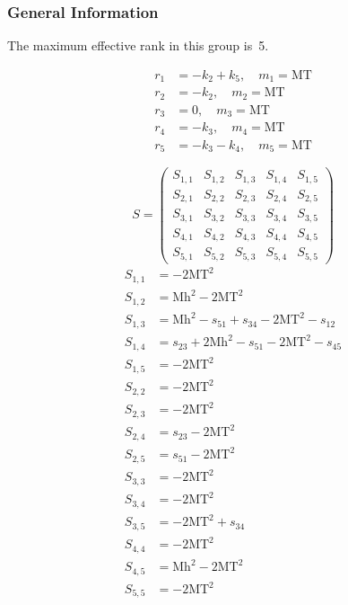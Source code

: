 \documentclass[a4paper]{article}
\begin{document}
\subsubsection*{General Information}
The maximum effective rank in this group is~5.

\begin{subequations}
\begin{align}
r_{1} &= -k_{2}+k_{5},\quad m_{1} = \text{MT}\\
r_{2} &= -k_{2},\quad m_{2} = \text{MT}\\
r_{3} &= 0,\quad m_{3} = \text{MT}\\
r_{4} &= -k_{3},\quad m_{4} = \text{MT}\\
r_{5} &= -k_{3}-k_{4},\quad m_{5} = \text{MT}
\end{align}
\end{subequations}

\begin{equation}
S=\left(\begin{array}{ccccc}
   S_{1,1}&
   S_{1,2}&
   S_{1,3}&
   S_{1,4}&
   S_{1,5}\\
   S_{2,1}&
   S_{2,2}&
   S_{2,3}&
   S_{2,4}&
   S_{2,5}\\
   S_{3,1}&
   S_{3,2}&
   S_{3,3}&
   S_{3,4}&
   S_{3,5}\\
   S_{4,1}&
   S_{4,2}&
   S_{4,3}&
   S_{4,4}&
   S_{4,5}\\
   S_{5,1}&
   S_{5,2}&
   S_{5,3}&
   S_{5,4}&
   S_{5,5}\end{array}\right)
\end{equation}
\begin{subequations}
\begin{align}
   S_{1,1}&=-2\text{MT}^2\\
   S_{1,2}&=\text{Mh}^2-2\text{MT}^2\\
   S_{1,3}&=\text{Mh}^2-s_{51}+s_{34}-2\text{MT}^2-s_{12}\\
   S_{1,4}&=s_{23}+2\text{Mh}^2-s_{51}-2\text{MT}^2-s_{45}\\
   S_{1,5}&=-2\text{MT}^2\\
   S_{2,2}&=-2\text{MT}^2\\
   S_{2,3}&=-2\text{MT}^2\\
   S_{2,4}&=s_{23}-2\text{MT}^2\\
   S_{2,5}&=s_{51}-2\text{MT}^2\\
   S_{3,3}&=-2\text{MT}^2\\
   S_{3,4}&=-2\text{MT}^2\\
   S_{3,5}&=-2\text{MT}^2+s_{34}\\
   S_{4,4}&=-2\text{MT}^2\\
   S_{4,5}&=\text{Mh}^2-2\text{MT}^2\\
   S_{5,5}&=-2\text{MT}^2
\end{align}
\end{subequations}
\end{document}
